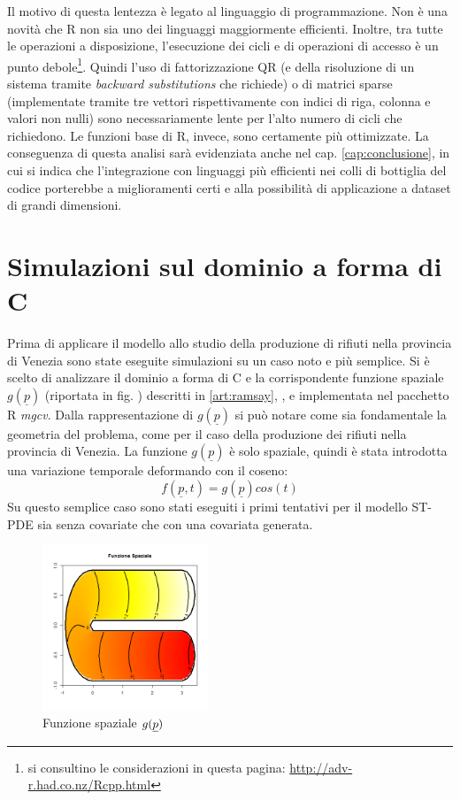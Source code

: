 \documentclass[a4paper,11pt,twoside,openright]{book}							%
\begin{document}
Il motivo di questa lentezza è legato al linguaggio di programmazione. Non è una novità che R non sia uno dei linguaggi maggiormente efficienti. Inoltre, tra tutte le operazioni a disposizione, l'esecuzione dei cicli e di operazioni di accesso è un punto debole\footnote{si consultino le considerazioni in questa pagina: \href{http://adv-r.had.co.nz/Rcpp.html}{http://adv-r.had.co.nz/Rcpp.html}}. Quindi l'uso di fattorizzazione QR (e della risoluzione di un sistema tramite \textit{backward substitutions} che richiede) o di matrici sparse (implementate tramite tre vettori rispettivamente con indici di riga, colonna e valori non nulli) sono necessariamente lente per l'alto numero di cicli che richiedono. Le funzioni base di R, invece, sono certamente più ottimizzate. La conseguenza di questa analisi sarà evidenziata anche nel cap. \ref{cap:conclusione}, in cui si indica che l'integrazione con linguaggi più efficienti nei colli di bottiglia del codice porterebbe a miglioramenti certi e alla possibilità di applicazione a dataset di grandi dimensioni.

\chapter{Simulazioni sul dominio a forma di C}
\label{cap:domC}
Prima di applicare il modello allo studio della produzione di rifiuti nella provincia di Venezia sono state eseguite simulazioni su un caso noto e più semplice. Si è scelto di analizzare il dominio a forma di C e la corrispondente funzione spaziale $g(\underline p)$ (riportata in fig. \cite{fig:domC_fstest}) descritti in \ref{art:ramsay}, \cite{art:sangalli}, \cite{art:wood} e implementata nel pacchetto R \textit{mgcv}. Dalla rappresentazione di $g(\underline p)$ si può notare come sia fondamentale la geometria del problema, come per il caso della produzione dei rifiuti nella provincia di Venezia. La funzione $g(\underline p)$ è solo spaziale, quindi è stata introdotta una variazione temporale deformando con il coseno:
$$
f(\underline p, t)=g(\underline p)cos(t)
$$
Su questo semplice caso sono stati eseguiti i primi tentativi per il modello ST-PDE sia senza covariate che con una covariata generata.
\begin{figure}[h]
	\centering
	\includegraphics[width=0.44\textwidth]{Immagini/DomCinizio/DomC_fstest.png}   
	\caption{Funzione spaziale $g(\protect\underline{p})$}
	\label{fig:domC_fstest}
\end{figure}
\end{document}

